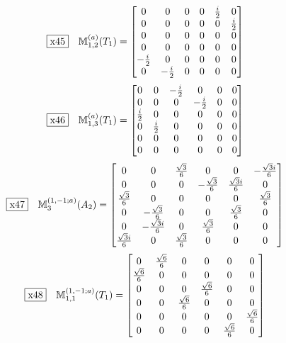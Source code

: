 \documentclass[fleqn,10pt,landscape]{jsarticle}
\begin{document}
\begin{dmath*}
\fbox{x45}\quad \mathbb{M}_{1,2}^{(a)}(T_{1})=\begin{bmatrix} 0 & 0 & 0 & 0 & \frac{i}{2} & 0 \\ 0 & 0 & 0 & 0 & 0 & \frac{i}{2} \\ 0 & 0 & 0 & 0 & 0 & 0 \\ 0 & 0 & 0 & 0 & 0 & 0 \\ - \frac{i}{2} & 0 & 0 & 0 & 0 & 0 \\ 0 & - \frac{i}{2} & 0 & 0 & 0 & 0 \end{bmatrix}
\end{dmath*}
\begin{dmath*}
\fbox{x46}\quad \mathbb{M}_{1,3}^{(a)}(T_{1})=\begin{bmatrix} 0 & 0 & - \frac{i}{2} & 0 & 0 & 0 \\ 0 & 0 & 0 & - \frac{i}{2} & 0 & 0 \\ \frac{i}{2} & 0 & 0 & 0 & 0 & 0 \\ 0 & \frac{i}{2} & 0 & 0 & 0 & 0 \\ 0 & 0 & 0 & 0 & 0 & 0 \\ 0 & 0 & 0 & 0 & 0 & 0 \end{bmatrix}
\end{dmath*}
\begin{dmath*}
\fbox{x47}\quad \mathbb{M}_{3}^{(1,-1;a)}(A_{2})=\begin{bmatrix} 0 & 0 & \frac{\sqrt{3}}{6} & 0 & 0 & - \frac{\sqrt{3} i}{6} \\ 0 & 0 & 0 & - \frac{\sqrt{3}}{6} & \frac{\sqrt{3} i}{6} & 0 \\ \frac{\sqrt{3}}{6} & 0 & 0 & 0 & 0 & \frac{\sqrt{3}}{6} \\ 0 & - \frac{\sqrt{3}}{6} & 0 & 0 & \frac{\sqrt{3}}{6} & 0 \\ 0 & - \frac{\sqrt{3} i}{6} & 0 & \frac{\sqrt{3}}{6} & 0 & 0 \\ \frac{\sqrt{3} i}{6} & 0 & \frac{\sqrt{3}}{6} & 0 & 0 & 0 \end{bmatrix}
\end{dmath*}
\begin{dmath*}
\fbox{x48}\quad \mathbb{M}_{1,1}^{(1,-1;a)}(T_{1})=\begin{bmatrix} 0 & \frac{\sqrt{6}}{6} & 0 & 0 & 0 & 0 \\ \frac{\sqrt{6}}{6} & 0 & 0 & 0 & 0 & 0 \\ 0 & 0 & 0 & \frac{\sqrt{6}}{6} & 0 & 0 \\ 0 & 0 & \frac{\sqrt{6}}{6} & 0 & 0 & 0 \\ 0 & 0 & 0 & 0 & 0 & \frac{\sqrt{6}}{6} \\ 0 & 0 & 0 & 0 & \frac{\sqrt{6}}{6} & 0 \end{bmatrix}
\end{dmath*}
\end{document}
